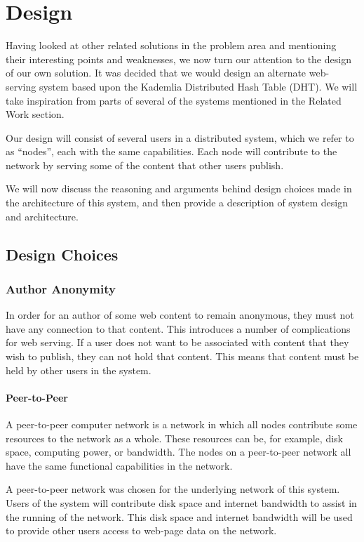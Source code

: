 \chapter{Design}

Having looked at other related solutions in the problem area and mentioning their
interesting points and weaknesses, we now turn our attention to the design of our own solution.
It was decided that we would design an alternate web-serving system based upon the Kademlia
Distributed Hash Table (DHT). We will take inspiration from parts of several of the systems
mentioned in the Related Work section.

Our design will consist of several users in a distributed system, which we refer to as ``nodes'',
each with the same capabilities. Each node will contribute to the network by serving some of the
content that other users publish.

We will now discuss the reasoning and arguments behind design choices made in the architecture of this system,
and then provide a description of system design and architecture.

\section{Design Choices}

\subsection{Author Anonymity}

In order for an author of some web content to remain anonymous, they must not have any connection
to that content. This introduces a number of complications for web serving. If a user does not want
to be associated with content that they wish to publish, they can not hold that content. This means
that content must be held by other users in the system.

\subsubsection{Peer-to-Peer}
A peer-to-peer computer network is a network in which all nodes contribute some resources to the
network as a whole. These resources can be, for example, disk space, computing power, or bandwidth.
The nodes on a peer-to-peer network all have the same functional capabilities in the network.

A peer-to-peer network was chosen for the underlying network of this system. Users of the system will
contribute disk space and internet bandwidth to assist in the running of the network. This disk space and
internet bandwidth will be used to provide other users access to web-page data on the network.

